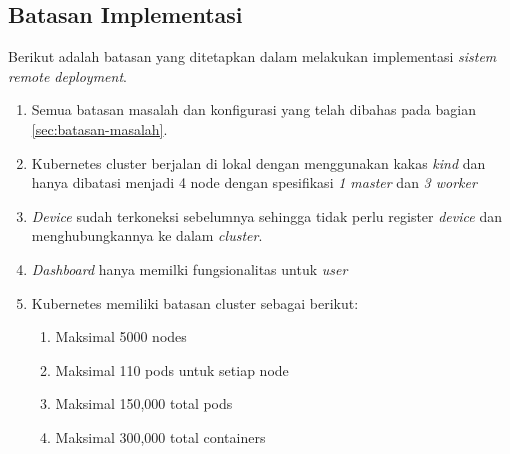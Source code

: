 \subsection{Batasan Implementasi}
Berikut adalah batasan yang ditetapkan dalam melakukan implementasi \textit{sistem remote deployment}.

\begin{enumerate}
  \item Semua batasan masalah dan konfigurasi yang telah dibahas pada bagian \ref{sec:batasan-masalah}.
  \item Kubernetes cluster berjalan di lokal dengan menggunakan kakas \textit{kind} dan hanya dibatasi menjadi 4 node dengan spesifikasi \textit{1 master} dan \textit{3 worker}
  \item \textit{Device} sudah terkoneksi sebelumnya sehingga tidak perlu register \textit{device} dan menghubungkannya ke dalam \textit{cluster}.
  \item \textit{Dashboard} hanya memilki fungsionalitas untuk \textit{user}
  \item Kubernetes memiliki batasan cluster sebagai berikut:
        \begin{enumerate}
          \item Maksimal 5000 nodes
          \item Maksimal 110 pods untuk setiap node
          \item Maksimal 150,000 total pods
          \item Maksimal 300,000 total containers
        \end{enumerate}
\end{enumerate}